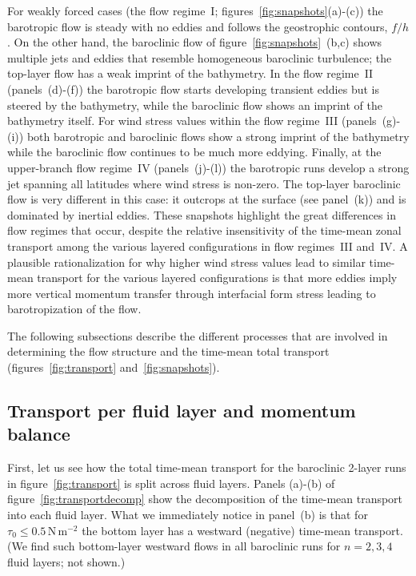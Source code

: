 \documentclass{agujournal2019}
\newcommand{\Pa}		{\mathrm{N}\,\mathrm{m}^{-2}}
\begin{document}
For weakly forced cases (the flow regime~I; figures~\ref{fig:snapshots}(a)-(c)) the barotropic flow is steady with no eddies and follows the geostrophic contours, $f/h$.  On the other hand, the baroclinic flow of figure~\ref{fig:snapshots}~(b,c) shows multiple jets and eddies that resemble {\color{black}homogeneous} baroclinic turbulence; the top-layer flow has a weak imprint of the bathymetry. In the flow regime~II (panels~(d)-(f)) the barotropic flow starts developing transient eddies but is steered by the bathymetry, while the baroclinic flow shows an imprint of the bathymetry itself. For wind stress values within the flow regime~III (panels~(g)-(i)) both barotropic and baroclinic flows show a strong imprint of the bathymetry while the baroclinic flow continues to be much more eddying. Finally, at the upper-branch flow regime~IV (panels~(j)-(l)) the barotropic runs develop a strong jet spanning all latitudes where wind stress is non-zero. The top-layer baroclinic flow is very different in this case: it outcrops at the surface (see panel~(k)) and is dominated by inertial eddies. These snapshots highlight the great differences in flow regimes that occur, despite the relative insensitivity of the time-mean zonal transport {\color{black}among the various layered configurations in flow regimes~III and~IV. A plausible rationalization for why higher wind stress values lead to similar time-mean transport for the various layered configurations is that more eddies imply more vertical momentum transfer through interfacial form stress leading to barotropization of the flow.}


The following subsections describe the different processes that are involved in determining the flow structure and the time-mean total transport (figures~\ref{fig:transport} and~\ref{fig:snapshots}).


\subsection{Transport per fluid layer and momentum balance}\label{sec:resultdetails1}

First, let us see how the total time-mean transport for the baroclinic 2-layer runs  in figure~\ref{fig:transport} is split across fluid layers. Panels (a)-(b) of figure~\ref{fig:transportdecomp} show the decomposition of the time-mean transport into each fluid layer. What we immediately notice in panel~(b) is that for $\tau_0\le0.5\,\Pa$ the bottom layer has a westward (negative) time-mean transport. (We find such bottom-layer westward flows in all baroclinic runs for $n=2, 3, 4$ fluid layers; not shown.)
\end{document}
